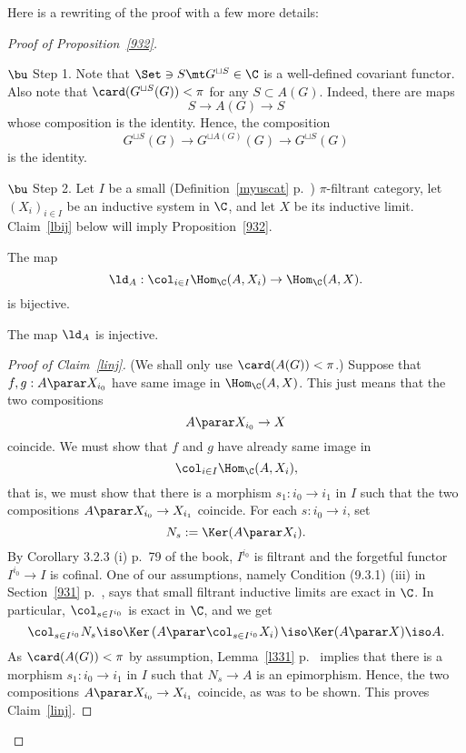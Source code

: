 \documentclass[12pt]{article}
\theoremstyle{remark}
\theoremstyle{definition}
\begin{document}
Here is a rewriting of the proof with a few more details:

\begin{proof}[Proof of Proposition~\ref{932}]${}$ 

\nn$\bu$ Step 1. Note that $\Set\ni S\mt G^{\sqcup S}\in\C$ is a well-defined covariant functor. Also note that $\card(G^{\sqcup S}(G))<\pi$ for any $S\subset A(G)$. Indeed, there are maps 
$$
S\to A(G)\to S
$$ 
whose composition is the identity. Hence, the composition 
$$
G^{\sqcup S}(G)\to G^{\sqcup A(G)}(G)\to G^{\sqcup S}(G)
$$ 
is the identity.

\nn$\bu$ Step 2. Let $I$ be a small (Definition~\ref{myuscat} p.~) $\pi$-filtrant category, let $(X_i)_{i\in I}$ be an inductive system in $\C$, and let $X$ be its inductive limit. Claim~\ref{lbij} below will imply Proposition~\ref{932}. 

\begin{claim} 
The map 
$$
\ld_A:\col_{i\in I}\Hom_\C(A,X_i)\to\Hom_\C(A,X).
$$ 
is bijective. 
\end{claim}

\begin{claim} 
The map $\ld_A$ is injective. 
\end{claim} 

\begin{proof}[Proof of Claim~\ref{linj}] 
(We shall only use $\card(A(G))<\pi$.) Suppose that $f,g:A\parar X_{i_0}$ have same image in $\Hom_\C(A,X)$. This just means that the two compositions 
$$
A\parar X_{i_0}\to X
$$ 
coincide. We must show that $f$ and $g$ have already same image in 
$$
\col_{i\in I}\Hom_\C(A,X_i),
$$ 
that is, we must show that there is a morphism $s_1:i_0\to i_1$ in $I$ such that the two compositions $A\parar X_{i_0}\to X_{i_1}$ coincide. For each $s:i_0\to i$, set 
$$
N_s:=\Ker(A\parar X_i).
$$ 
By Corollary 3.2.3 (i) p.~79 of the book, $I^{i_0}$ is filtrant and the forgetful functor $I^{i_0}\to I$ is cofinal. One of our assumptions, namely Condition (9.3.1) (iii) in Section~\ref{931} p.~, says that small filtrant inductive limits are exact in $\C$. In particular, $\col_{s\in I^{i_0}}$ is exact in $\C$, and we get  
$$
\col_{s\in I^{i_0}}N_s\iso\Ker\left(A\parar\col_{s\in I^{i_0}}X_i\right)\iso\Ker(A\parar X)\iso A. 
$$ 
As $\card(A(G))<\pi$ by assumption, Lemma~\ref{l331} p.~ implies that there is a morphism $s_1:i_0\to i_1$ in $I$ such that $N_s\to A$ is an epimorphism. Hence, the two compositions $A\parar X_{i_0}\to X_{i_1}$ coincide, as was to be shown. This proves Claim~\ref{linj}. 
\end{proof} 


\end{proof}
\end{document}
